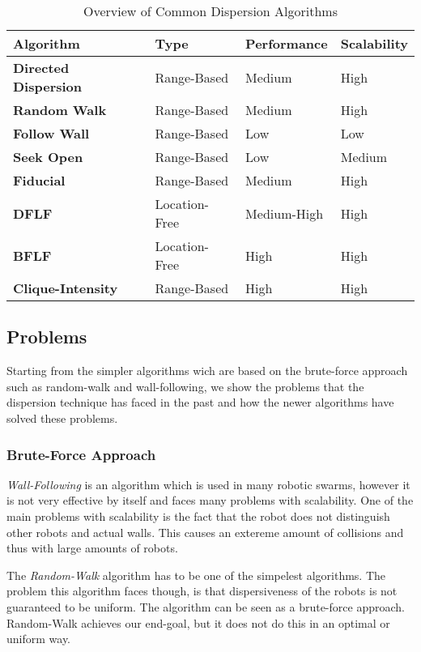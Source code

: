   \begin{table}[H]
  \renewcommand{\arraystretch}{1.3}
  \caption{Overview of Common Dispersion Algorithms}
  \label{table_alg_dispersion}
  \centering
    \begin{tabular}{|l|l|l|l|}
    \hline
    \bfseries Algorithm & \bfseries Type & \bfseries Performance & \bfseries Scalability\\
    \hline
    \bfseries Directed Dispersion & Range-Based & Medium & High\\\hline
    \bfseries Random Walk& Range-Based & Medium & High\\\hline
    \bfseries Follow Wall& Range-Based & Low & Low\\\hline
    \bfseries Seek Open& Range-Based & Low & Medium\\\hline
    \bfseries Fiducial& Range-Based & Medium & High\\\hline
    \bfseries DFLF& Location-Free & Medium-High & High\\\hline
    \bfseries BFLF & Location-Free & High & High\\\hline
    \bfseries Clique-Intensity& Range-Based & High & High\\\hline
    \end{tabular}
  \end{table}

  \subsection{Problems}
Starting from the simpler algorithms wich are based on the brute-force approach such as random-walk and wall-following, we show the problems that the dispersion technique has faced in the past and how the newer algorithms have solved these problems.

\subsubsection{Brute-Force Approach}
\emph{Wall-Following} is an algorithm which is used in many robotic swarms, however it is not very effective by itself and faces many problems with scalability.
One of the main problems with scalability is the fact that the robot does not distinguish other robots and actual walls.
This causes an extereme amount of collisions and thus with large amounts of robots.

The \emph{Random-Walk} algorithm has to be one of the simpelest algorithms.
The problem this algorithm faces though, is that dispersiveness of the robots is not guaranteed to be uniform.
The algorithm can be seen as a brute-force approach.
Random-Walk achieves our end-goal, but it does not do this in an optimal or uniform way.


